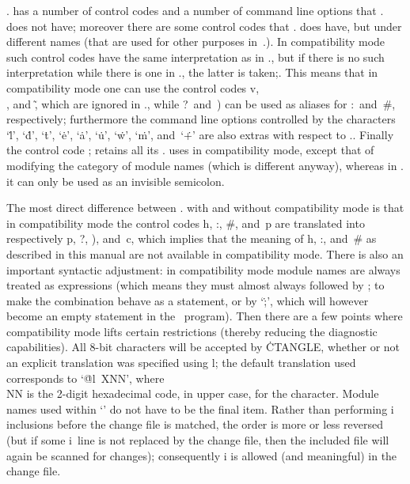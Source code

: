 \CWEBx. has a number of control codes and a number of command line options
that \LKC. does not have; moreover there are some control codes that \LKC.
does have, but under different names (that are used for other purposes
in~\CWEBx.). In compatibility mode such control codes have the same
interpretation as in \LKC., but if there is no such interpretation while
there is one in \CWEBx., the latter is taken;. This means that in
compatibility mode one can use the control codes \:v, \:\\, and \:\~, which
are ignored in \LKC., while \:?~and~\:) can be used as aliases for
\::~and~\:\#, respectively; furthermore the command line options controlled
by the characters `\.l', `\.d', `\.t', `\.e', `\.a', `\.u', `\.w', `\.m',
and~`\.+' are also extras with respect to \LKC.. Finally the control code \:;
retains all its \CWEBx. uses in compatibility mode, except that of modifying
the category of module names (which is different anyway), whereas in \LKC.
it can only be used as an invisible semicolon.

The most direct difference between \CWEBx. with and without compatibility
mode is that in compatibility mode the control codes \:h, \::, \:\#, and~\:p
are translated into respectively \:p, \:?, \:), and~\:c, which implies that
the meaning of \:h, \::, and~\:\# as described in this manual are not
available in compatibility mode. There is also an important syntactic
adjustment: in compatibility mode module names are always treated as
expressions (which means they must almost always followed by \:; to make the
combination behave as a statement, or by `\.;', which will however become an
empty statement in the \Cee~program). Then there are a few points where
compatibility mode lifts certain restrictions (thereby reducing the
diagnostic capabilities). All 8-bit characters will be accepted by
\.{CTANGLE}, whether or not an explicit translation was specified using \:l;
the default translation used corresponds to `\hbox{\.{@l 
X}\\{NN}}', where \\{NN} is the 2-digit hexadecimal code, in upper case, for
the character. Module names used within `\pb' do not have to be the final
item. Rather than performing \:i inclusions before the change file is
matched, the order is more or less reversed (but if some \:i~line is not
replaced by the change file, then the included file will again be scanned
for changes); consequently \:i is allowed (and meaningful) in the change
file.

